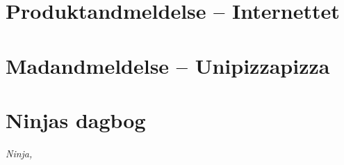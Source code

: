 \begin{minipage}[t]{100mm}
\vspace{1mm}
\section*{Produktandmeldelse -- Internettet}


\vspace{1mm}
\section*{Madandmeldelse -- Unipizzapizza}
\vspace{2mm}

\section*{Ninjas dagbog}

{\flushright\emph{Ninja, }}


\end{minipage}

